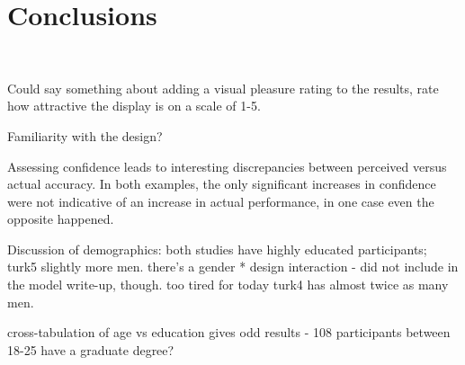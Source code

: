 \section{Conclusions}~\label{conclusions}

Could say something about adding a visual pleasure rating to the results, rate how attractive the display is on a scale of 1-5.

Familiarity with the design?

Assessing confidence leads to interesting discrepancies between perceived versus actual accuracy. In both examples, the only significant increases in confidence were not indicative of an increase in actual performance, in one case even the opposite happened. 

Discussion of demographics: both studies have highly educated participants; turk5 slightly more men. there's a gender * design interaction - did not include in the model write-up, though. too tired for today
turk4 has almost twice as many men.

cross-tabulation of age vs education gives odd results - 108 participants between 18-25 have a graduate degree?

